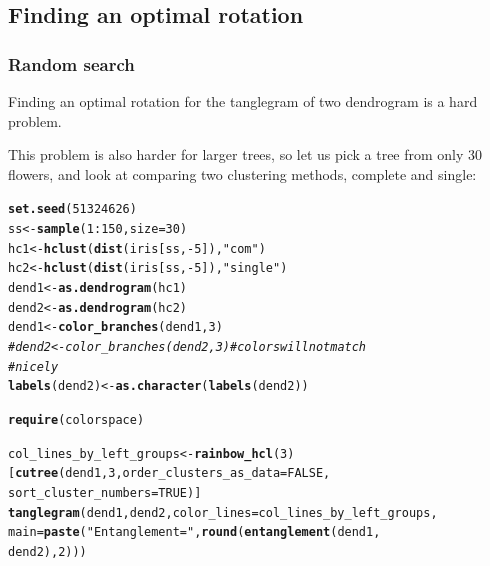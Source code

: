 \documentclass[shortnames,nojss,article]{jss}\usepackage[]{graphicx}\usepackage[]{color}
\makeatletter
\newcommand{\hlnum}[1]{\textcolor[rgb]{0.686,0.059,0.569}{#1}}%
\newcommand{\hlstr}[1]{\textcolor[rgb]{0.192,0.494,0.8}{#1}}%
\newcommand{\hlcom}[1]{\textcolor[rgb]{0.678,0.584,0.686}{\textit{#1}}}%
\newcommand{\hlopt}[1]{\textcolor[rgb]{0,0,0}{#1}}%
\newcommand{\hlstd}[1]{\textcolor[rgb]{0.345,0.345,0.345}{#1}}%
\newcommand{\hlkwb}[1]{\textcolor[rgb]{0.69,0.353,0.396}{#1}}%
\newcommand{\hlkwc}[1]{\textcolor[rgb]{0.333,0.667,0.333}{#1}}%
\newcommand{\hlkwd}[1]{\textcolor[rgb]{0.737,0.353,0.396}{\textbf{#1}}}%
\newenvironment{kframe}{%
 \def\at@end@of@kframe{}%
 \ifinner\ifhmode%
  \def\at@end@of@kframe{\end{minipage}}%
  \begin{minipage}{\columnwidth}%
 \fi\fi%
 \def\FrameCommand##1{\hskip\@totalleftmargin \hskip-\fboxsep
 \colorbox{shadecolor}{##1}\hskip-\fboxsep
     \hskip-\linewidth \hskip-\@totalleftmargin \hskip\columnwidth}%
 \MakeFramed {\advance\hsize-\width
   \@totalleftmargin\z@ \linewidth\hsize
   \@setminipage}}%
 {\par\unskip\endMakeFramed%
 \at@end@of@kframe}
\newenvironment{knitrout}{}{} %
\makeatother
\begin{document}
\subsection{Finding an optimal rotation}

\subsubsection{Random search}


Finding an optimal rotation for the tanglegram of two dendrogram is a hard problem.

This problem is also harder for larger trees, so let us pick a tree from only 30 flowers, and look at comparing two clustering methods, complete and single:


\begin{knitrout}
\color{fgcolor}\begin{kframe}
\begin{alltt}
\hlkwd{set.seed}\hlstd{(}\hlnum{51324626}\hlstd{)}
\hlstd{ss} \hlkwb{<-} \hlkwd{sample}\hlstd{(}\hlnum{1}\hlopt{:}\hlnum{150}\hlstd{,} \hlkwc{size} \hlstd{=} \hlnum{30}\hlstd{)}
\hlstd{hc1} \hlkwb{<-} \hlkwd{hclust}\hlstd{(}\hlkwd{dist}\hlstd{(iris[ss,} \hlopt{-}\hlnum{5}\hlstd{]),} \hlstr{"com"}\hlstd{)}
\hlstd{hc2} \hlkwb{<-} \hlkwd{hclust}\hlstd{(}\hlkwd{dist}\hlstd{(iris[ss,} \hlopt{-}\hlnum{5}\hlstd{]),} \hlstr{"single"}\hlstd{)}
\hlstd{dend1} \hlkwb{<-} \hlkwd{as.dendrogram}\hlstd{(hc1)}
\hlstd{dend2} \hlkwb{<-} \hlkwd{as.dendrogram}\hlstd{(hc2)}
\hlstd{dend1} \hlkwb{<-} \hlkwd{color_branches}\hlstd{(dend1,} \hlnum{3}\hlstd{)}
\hlcom{# dend2 <- color_branches(dend2, 3) # colors will not match}
\hlcom{# nicely}
\hlkwd{labels}\hlstd{(dend2)} \hlkwb{<-} \hlkwd{as.character}\hlstd{(}\hlkwd{labels}\hlstd{(dend2)}\hlstd{)}

\hlkwd{require}\hlstd{(colorspace}\hlstd{)}

\hlstd{col_lines_by_left_groups} \hlkwb{<-} \hlkwd{rainbow_hcl}\hlstd{(}\hlnum{3}\hlstd{)[}\hlkwd{cutree}\hlstd{(dend1,} \hlnum{3}\hlstd{,} \hlkwc{order_clusters_as_data} \hlstd{=} \hlnum{FALSE}\hlstd{,}
    \hlkwc{sort_cluster_numbers} \hlstd{=} \hlnum{TRUE}\hlstd{)]}
\hlkwd{tanglegram}\hlstd{(dend1, dend2,} \hlkwc{color_lines} \hlstd{= col_lines_by_left_groups,}
    \hlkwc{main} \hlstd{=} \hlkwd{paste}\hlstd{(}\hlstr{"Entanglement ="}\hlstd{,} \hlkwd{round}\hlstd{(}\hlkwd{entanglement}\hlstd{(dend1,}
        \hlstd{dend2),} \hlnum{2}\hlstd{)))}
\end{alltt}
\end{kframe}


\end{knitrout}
\end{document}
